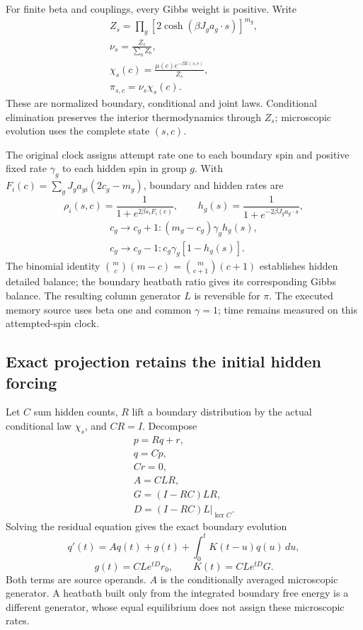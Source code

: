 For finite beta and couplings, every Gibbs weight is positive. Write
\[
\begin{gathered}
Z_s=\prod_g[2\cosh(\beta J_ga_g\cdot s)]^{m_g},\\
\nu_s=\frac{Z_s}{\sum_bZ_b},\\
\chi_s(c)=\frac{\mu(c)e^{-\beta E(s,c)}}{Z_s},\\
\pi_{s,c}=\nu_s\chi_s(c).
\end{gathered}
\]
These are normalized boundary, conditional and joint laws. Conditional
elimination preserves the interior thermodynamics through \(Z_s\);
microscopic evolution uses the complete state \((s,c)\).

The original clock assigns attempt rate one to each boundary spin and
positive fixed rate \(\gamma_g\) to each hidden spin in group \(g\).
With \(F_i(c)=\sum_gJ_ga_{gi}(2c_g-m_g)\), boundary and hidden rates are
\[
 \rho_i(s,c)=\frac1{1+e^{2\beta s_iF_i(c)}},\qquad
 h_g(s)=\frac1{1+e^{-2\beta J_ga_g\cdot s}},
\]
\[
\begin{gathered}
c_g\longrightarrow c_g+1:
      (m_g-c_g)\gamma_gh_g(s),\\
c_g\longrightarrow c_g-1:
      c_g\gamma_g[1-h_g(s)].
\end{gathered}
\]
The binomial identity
\(\binom{m}{c}(m-c)=\binom{m}{c+1}(c+1)\) establishes hidden detailed
balance; the boundary heatbath ratio gives its corresponding Gibbs
balance. The resulting column generator \(L\) is reversible for \(\pi\).
The executed memory source uses beta one and common \(\gamma=1\);
time remains measured on this attempted-spin clock.

\subsection{Exact projection retains the initial hidden forcing}

Let \(C\) sum hidden counts, \(R\) lift a boundary distribution by the
actual conditional law \(\chi_s\), and \(CR=I\). Decompose
\[
\begin{gathered}
p=Rq+r,\\
q=Cp,\\
Cr=0,\\
A=CLR,\\
G=(I-RC)LR,\\
D=(I-RC)L\big|_{\ker C}.
\end{gathered}
\]
Solving the residual equation gives the exact boundary evolution
\[
 q'(t)=Aq(t)+g(t)+\int_0^tK(t-u)q(u)\,du,
\]
\[
 g(t)=CLe^{tD}r_0,\qquad K(t)=CLe^{tD}G.
\]
Both terms are source operands. \(A\) is the conditionally averaged
microscopic generator. A heatbath built only from the integrated
boundary free energy is a different generator, whose equal equilibrium
does not assign these microscopic rates.


